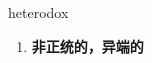 
\begin{frame}
{\huge heterodox}
\begin{center}
\begin{enumerate}\Large
  \item \textbf{非正统的，异端的}
\end{enumerate}
\end{center}
\end{frame}

